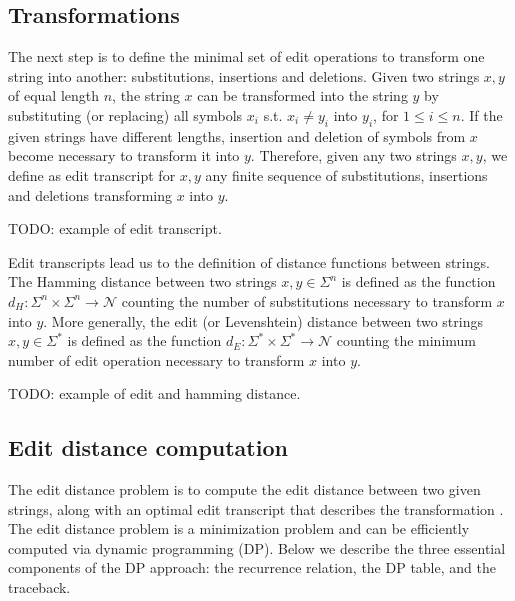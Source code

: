 \subsection{Transformations}

The next step is to define the minimal set of edit operations to transform one string into another: substitutions, insertions and deletions.
Given two strings $x,y$ of equal length $n$, the string $x$ can be transformed into the string $y$ by substituting (or replacing) all symbols $x_i$ s.t. $x_i \neq y_i$ into $y_i$, for $1 \leq i \leq n$.
If the given strings have different lengths, insertion and deletion of symbols from $x$ become necessary to transform it into $y$.
Therefore, given any two strings $x,y$, we define as edit transcript for $x,y$ any finite sequence of substitutions, insertions and deletions transforming $x$ into $y$.

\begin{example}
TODO: example of edit transcript.
\end{example}

Edit transcripts lead us to the definition of distance functions between strings.
The Hamming distance between two strings $x,y \in \Sigma^{n}$ is defined as the function $d_H : \Sigma^{n} \times \Sigma^{n} \rightarrow \mathcal{N}$ counting the number of substitutions necessary to transform $x$ into $y$.
More generally, the edit (or Levenshtein) distance between two strings $x,y \in \Sigma^{*}$ is defined as the function $d_E : \Sigma^{*} \times \Sigma^{*} \rightarrow \mathcal{N}$ counting the minimum number of edit operation necessary to transform $x$ into $y$.

\begin{example}
TODO: example of edit and hamming distance.
\end{example}

\subsection{Edit distance computation}

The edit distance problem is to compute the edit distance between two given strings, along with an optimal edit transcript that describes the transformation \cite{Gusfield1997}.
The edit distance problem is a minimization problem and can be efficiently computed via dynamic programming (DP). Below we describe the three essential components of the DP approach: the recurrence relation, the DP table, and the traceback.

